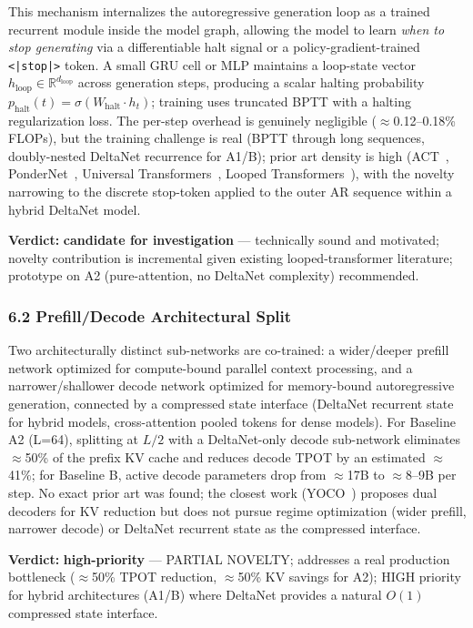 \documentclass[11pt]{article}
\begin{document}
This mechanism internalizes the autoregressive generation loop as a trained recurrent module inside the model graph, allowing the model to learn \emph{when to stop generating} via a differentiable halt signal or a policy-gradient-trained \texttt{<|stop|>} token.
A small GRU cell or MLP maintains a loop-state vector $h_{\text{loop}} \in \mathbb{R}^{d_{\text{loop}}}$ across generation steps, producing a scalar halting probability $p_{\text{halt}}(t) = \sigma(W_{\text{halt}} \cdot h_t)$; training uses truncated BPTT with a halting regularization loss.
The per-step overhead is genuinely negligible ($\approx$0.12--0.18\% FLOPs), but the training challenge is real (BPTT through long sequences, doubly-nested DeltaNet recurrence for A1/B); prior art density is high (ACT~\cite{graves2016act}, PonderNet~\cite{banino2021pondernet}, Universal Transformers~\cite{Dehghani2019UT}, Looped Transformers~\cite{Fan2024LoopedTransformers}), with the novelty narrowing to the discrete stop-token applied to the outer AR sequence within a hybrid DeltaNet model.

\textbf{Verdict:} \textbf{candidate for investigation} --- technically sound and motivated; novelty contribution is incremental given existing looped-transformer literature; prototype on A2 (pure-attention, no DeltaNet complexity) recommended.

\subsubsection{6.2 Prefill/Decode Architectural Split}
\label{sec:idea_6_2}

Two architecturally distinct sub-networks are co-trained: a wider/deeper prefill network optimized for compute-bound parallel context processing, and a narrower/shallower decode network optimized for memory-bound autoregressive generation, connected by a compressed state interface (DeltaNet recurrent state for hybrid models, cross-attention pooled tokens for dense models).
For Baseline A2 (L=64), splitting at $L/2$ with a DeltaNet-only decode sub-network eliminates $\approx$50\% of the prefix KV cache and reduces decode TPOT by an estimated $\approx$41\%; for Baseline B, active decode parameters drop from $\approx$17B to $\approx$8--9B per step.
No exact prior art was found; the closest work (YOCO~\cite{sun2024yoco}) proposes dual decoders for KV reduction but does not pursue regime optimization (wider prefill, narrower decode) or DeltaNet recurrent state as the compressed interface.

\textbf{Verdict:} \textbf{high-priority} --- PARTIAL NOVELTY; addresses a real production bottleneck ($\approx$50\% TPOT reduction, $\approx$50\% KV savings for A2); HIGH priority for hybrid architectures (A1/B) where DeltaNet provides a natural $O(1)$ compressed state interface.
\end{document}
